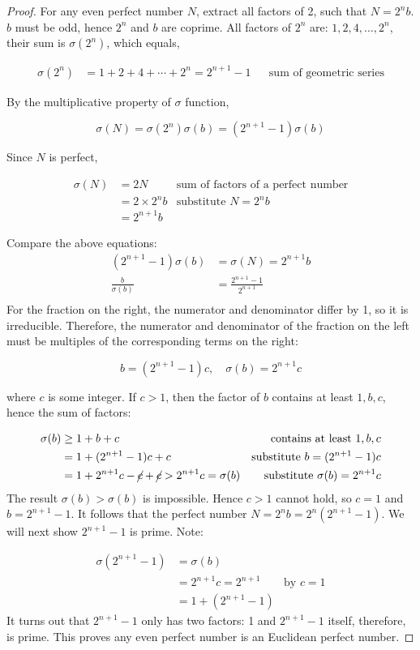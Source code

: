 \begin{proof}
For any even perfect number $N$, extract all factors of 2, such that $N = 2^nb$. $b$ must be odd, hence $2^n$ and $b$ are coprime. All factors of $2^n$ are: $1, 2, 4, \dotsc, 2^n$, their sum is $\sigma(2^n)$, which equals,

\begin{align*}
\sigma(2^n) &= 1 + 2 + 4 + \dotsb + 2^n = 2^{n+1} - 1 && \text{sum of geometric series}
\end{align*}

By the multiplicative property of $\sigma$ function,

\[
\sigma(N) = \sigma(2^n)\sigma(b) = (2^{n+1}-1)\sigma(b)
\]

Since $N$ is perfect,

\begin{align*}
\sigma(N) &= 2N  & \text{sum of factors of a perfect number} \\
          &= 2 \times 2^n b & \text{substitute }N = 2^n b \\
          &= 2^{n+1} b
\end{align*}

Compare the above equations:
\begin{align*}
(2^{n+1}-1)\sigma(b) &= \sigma(N) = 2^{n+1}b \\
\frac{b}{\sigma(b)} &= \frac{2^{n+1} - 1}{2^{n+1}} \\
\end{align*}
For the fraction on the right, the numerator and denominator differ by 1, so it is irreducible. Therefore, the numerator and denominator of the fraction on the left must be multiples of the corresponding terms on the right:

\[
b = (2^{n+1} - 1)c, \quad \sigma(b) = 2^{n+1}c
\]

where $c$ is some integer. If $c > 1$, then the factor of $b$ contains at least $1, b, c$, hence the sum of factors:

\begin{align*}
\sigma(b) &\geq 1 + b + c   & \text{contains at least }1, b, c \\
          &= 1 + (2^{n+1} -1)c + c &\text{substitute } b = (2^{n+1} - 1)c \\
          &= 1 + 2^{n+1}c - \cancel{c} + \cancel{c} > 2^{n+1}c = \sigma(b) &\text{substitute } \sigma(b) = 2^{n+1}c
\end{align*}
The result $\sigma(b)>\sigma(b)$ is impossible. Hence $c>1$ cannot hold, so $c=1$ and $b=2^{n+1}-1$. It follows that the perfect number $N=2^nb=2^n(2^{n+1}-1)$. We will next show $2^{n+1}-1$ is prime. Note:

\begin{align*}
\sigma(2^{n+1} - 1) &= \sigma(b) \\
          &= 2^{n+1}c = 2^{n+1} & \text{by }c = 1 \\
          &=1 + (2^{n + 1} - 1)
\end{align*}
It turns out that $2^{n+1}-1$ only has two factors: 1 and $2^{n+1} - 1$ itself, therefore, is prime. This proves any even perfect number is an Euclidean perfect number.
\end{proof}
